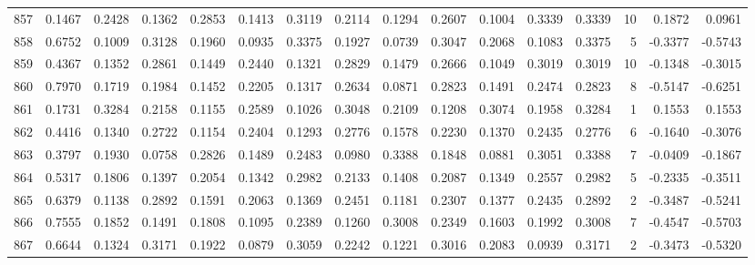 \begin{tabular}{lrrrrrrrrrrrrrrr}
857 &      0.1467 &  0.2428 &  0.1362 &  0.2853 &  0.1413 &  0.3119 &  0.2114 &  0.1294 &  0.2607 &  0.1004 &   0.3339 &     0.3339 &     10 &                    0.1872 &                     0.0961 \\
858 &      0.6752 &  0.1009 &  0.3128 &  0.1960 &  0.0935 &  0.3375 &  0.1927 &  0.0739 &  0.3047 &  0.2068 &   0.1083 &     0.3375 &      5 &                   -0.3377 &                    -0.5743 \\
859 &      0.4367 &  0.1352 &  0.2861 &  0.1449 &  0.2440 &  0.1321 &  0.2829 &  0.1479 &  0.2666 &  0.1049 &   0.3019 &     0.3019 &     10 &                   -0.1348 &                    -0.3015 \\
860 &      0.7970 &  0.1719 &  0.1984 &  0.1452 &  0.2205 &  0.1317 &  0.2634 &  0.0871 &  0.2823 &  0.1491 &   0.2474 &     0.2823 &      8 &                   -0.5147 &                    -0.6251 \\
861 &      0.1731 &  0.3284 &  0.2158 &  0.1155 &  0.2589 &  0.1026 &  0.3048 &  0.2109 &  0.1208 &  0.3074 &   0.1958 &     0.3284 &      1 &                    0.1553 &                     0.1553 \\
862 &      0.4416 &  0.1340 &  0.2722 &  0.1154 &  0.2404 &  0.1293 &  0.2776 &  0.1578 &  0.2230 &  0.1370 &   0.2435 &     0.2776 &      6 &                   -0.1640 &                    -0.3076 \\
863 &      0.3797 &  0.1930 &  0.0758 &  0.2826 &  0.1489 &  0.2483 &  0.0980 &  0.3388 &  0.1848 &  0.0881 &   0.3051 &     0.3388 &      7 &                   -0.0409 &                    -0.1867 \\
864 &      0.5317 &  0.1806 &  0.1397 &  0.2054 &  0.1342 &  0.2982 &  0.2133 &  0.1408 &  0.2087 &  0.1349 &   0.2557 &     0.2982 &      5 &                   -0.2335 &                    -0.3511 \\
865 &      0.6379 &  0.1138 &  0.2892 &  0.1591 &  0.2063 &  0.1369 &  0.2451 &  0.1181 &  0.2307 &  0.1377 &   0.2435 &     0.2892 &      2 &                   -0.3487 &                    -0.5241 \\
866 &      0.7555 &  0.1852 &  0.1491 &  0.1808 &  0.1095 &  0.2389 &  0.1260 &  0.3008 &  0.2349 &  0.1603 &   0.1992 &     0.3008 &      7 &                   -0.4547 &                    -0.5703 \\
867 &      0.6644 &  0.1324 &  0.3171 &  0.1922 &  0.0879 &  0.3059 &  0.2242 &  0.1221 &  0.3016 &  0.2083 &   0.0939 &     0.3171 &      2 &                   -0.3473 &                    -0.5320 \\

\end{tabular}
